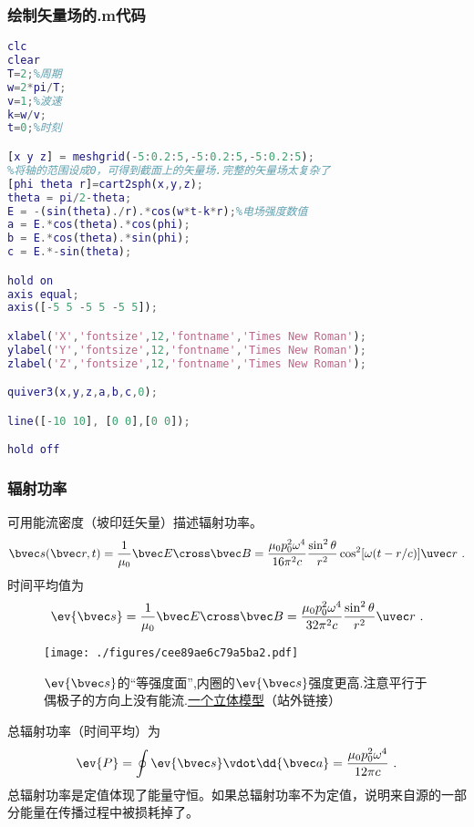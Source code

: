 \subsubsection{绘制矢量场的.m代码}
\begin{lstlisting}[language=matlab]
clc
clear
T=2;%周期
w=2*pi/T;
v=1;%波速
k=w/v;
t=0;%时刻

[x y z] = meshgrid(-5:0.2:5,-5:0.2:5,-5:0.2:5);
%将轴的范围设成0，可得到截面上的矢量场.完整的矢量场太复杂了
[phi theta r]=cart2sph(x,y,z);
theta = pi/2-theta;
E = -(sin(theta)./r).*cos(w*t-k*r);%电场强度数值
a = E.*cos(theta).*cos(phi);
b = E.*cos(theta).*sin(phi);
c = E.*-sin(theta);

hold on
axis equal;
axis([-5 5 -5 5 -5 5]);

xlabel('X','fontsize',12,'fontname','Times New Roman');
ylabel('Y','fontsize',12,'fontname','Times New Roman');
zlabel('Z','fontsize',12,'fontname','Times New Roman');

quiver3(x,y,z,a,b,c,0);

line([-10 10], [0 0],[0 0]);

hold off

\end{lstlisting}


\subsubsection{辐射功率}
可用能流密度（坡印廷矢量）描述辐射功率。
\begin{equation}
\bvec s(\bvec r, t) = \frac{1}{\mu_0} \bvec E \cross \bvec B = \frac{\mu_0p_0^2\omega^4}{16\pi^2c} \frac{\sin^2\theta}{r^2} \cos^2[\omega(t - r/c)] \uvec r~.
\end{equation}
时间平均值为
\begin{equation}
\ev{\bvec s} = \frac{1}{\mu_0} \bvec E \cross \bvec B
= \frac{\mu_0p_0^2\omega^4}{32\pi^2c} \frac{\sin^2\theta}{r^2} \uvec r~.
\end{equation}

\begin{figure}[ht]
\centering
\texttt{[image: ./figures/cee89ae6c79a5ba2.pdf]}
\caption{$\ev{\bvec s}$的“等强度面”,内圈的$\ev{\bvec s}$强度更高.注意平行于偶极子的方向上没有能流.\href{https://www.geogebra.org/m/semmtxm5}{一个立体模型}（站外链接）} \label{fig_DipRad_2}
\end{figure}
总辐射功率（时间平均）为
\begin{equation}
\ev{P} = \oint \ev{\bvec s} \vdot \dd{\bvec a} = \frac{\mu_0 p_0^2 \omega^4}{12\pi c}~.
\end{equation}
总辐射功率是定值体现了能量守恒。如果总辐射功率不为定值，说明来自源的一部分能量在传播过程中被损耗掉了。

